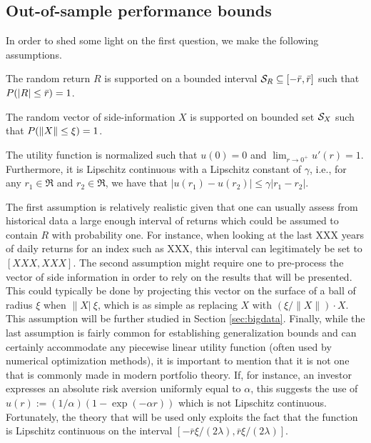 \subsection{Out-of-sample performance bounds}

In order to shed some light on the first question, we make the following assumptions.

\begin{assumption}\label{ass:R}
  The random return $R$ is supported on a bounded interval
  ${\mathcal{S}_R}\subseteq [-\bar{r},\bar{r}]$ such that $P(|R|\leq \bar{r})=1$.
\end{assumption}

\begin{assumption}\label{ass:X}
  The random vector of side-information $X$ is supported on bounded set ${\mathcal{S}_X}$ such that
  $P(\|X\|\leq \xi)=1$.
\end{assumption}

\begin{assumption}\label{ass:u}
  The utility function is normalized such that $u(0)=0$ and $\lim_{r\to0^+}u'(r) =
  1$. Furthermore, it is Lipschitz continuous with a Lipschitz constant of $\gamma$, i.e.,
  for any $r_1\in\Re$ and $r_2\in\Re$, we have that
  $|u(r_1) - u(r_2)| \leq \gamma|r_1-r_2|$.
\end{assumption}

The first assumption is relatively realistic given that one can usually assess from
historical data a large enough interval of returns which could be assumed to contain $R$
with probability one. For instance, when looking at the last XXX years of daily returns
for an index such as XXX, this interval can legitimately be set to $[XXX , XXX]$. The
second assumption might require one to pre-process the vector of side information in order
to rely on the results that will be presented. This could typically be done by projecting
this vector on the surface of a ball of radius $\xi$ when $\|X|\>\xi$, which is as simple
as replacing $X$ with $(\xi/\|X\|)\cdot X$. This assumption will be further studied in
Section \ref{sec:bigdata}. Finally, while the last assumption is fairly common for
establishing generalization bounds and can certainly accommodate any piecewise linear
utility function (often used by numerical optimization methods), it is important to
mention that it is not one that is commonly made in modern portfolio theory. If, for
instance, an investor expresses an absolute risk aversion uniformly equal to $\alpha$,
this suggests the use of $u(r):=(1/\alpha)(1-\exp(-\alpha r))$ which is not Lipschitz
continuous. Fortunately, the theory that will be used only exploits the fact that the
function is Lipschitz continuous on the interval
$[-\bar{r}\xi/(2\lambda), \bar{r}\xi/(2\lambda)]$.

